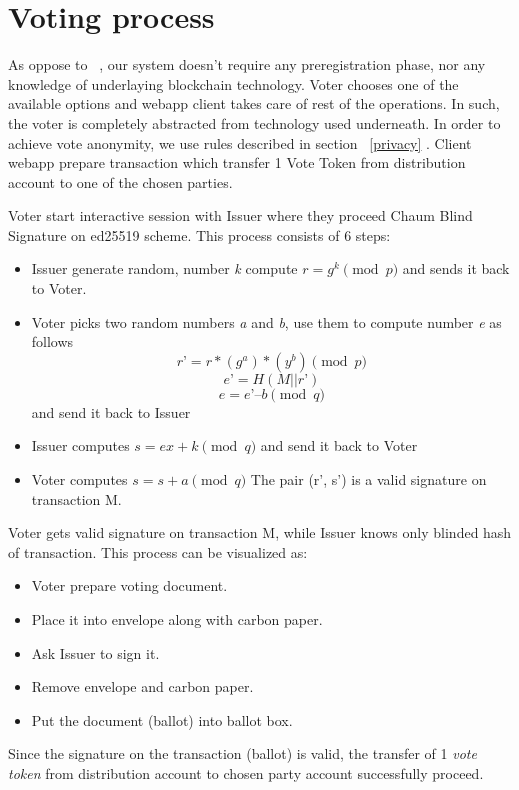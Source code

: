 \documentclass[runningheads]{llncs}
\begin{document}


\section{Voting process}
As oppose to ~\cite{liu2017voting}, our system doesn't require any preregistration phase, nor any knowledge of underlaying blockchain technology.  Voter chooses one of the available options and webapp client takes care of rest of the operations. In such, the voter is completely abstracted from technology used underneath.
In order to achieve vote anonymity, we use rules described in section ~\ref{privacy} . Client webapp prepare transaction which transfer 1 Vote Token from distribution account to one of the chosen parties.

Voter start interactive session with Issuer where they proceed Chaum Blind Signature \cite{blindsignatureschaum} on ed25519 scheme. This process consists of 6 steps:
\begin{itemize}
\item Issuer generate random, number \textit{k} compute 
\(r = g^k \pmod{p}\)
and sends it back to Voter.
\item Voter picks two random numbers \textit{a} and \textit{b}, use them to compute number \textit{e} as follows
\[r’ = r*(g^a)*(y^b) \pmod{p}\]
\[e’ = H(M || r’)\]
\[e = e’ – b \pmod{q}\]
and send it back to Issuer
\item Issuer computes 
\(s = ex + k \pmod{q}\)
and send it back to Voter
\item Voter computes 
$s = s + a \pmod{q}$
The pair (r’, s’) is a valid signature on transaction M.
\end{itemize}
Voter gets valid signature on transaction M, while Issuer knows only blinded hash of transaction.
This process can be visualized as:
\begin{itemize}
    \item Voter prepare voting document.
    \item Place it into envelope along with carbon paper.
    \item Ask Issuer to sign it.
    \item Remove envelope and carbon paper.
    \item Put the document (ballot) into ballot box.
\end{itemize}

Since the signature on the transaction (ballot) is valid, the transfer of 1 \textit{vote token} from distribution account to chosen party account successfully proceed.
\end{document}
